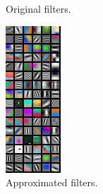 \documentclass{article}
\begin{document}
\begin{figure}[h]
\begin{minipage}[b]{0.48\linewidth}
  	\caption{Original filters.}
  \end{minipage}
  \hspace{2mm}
  \begin{minipage}[b]{0.48\linewidth}
  	\includegraphics[width=\textwidth]{img/first_appr.png}
  	\caption{Approximated filters.}
  \end{minipage}
\end{figure}
\end{document}
